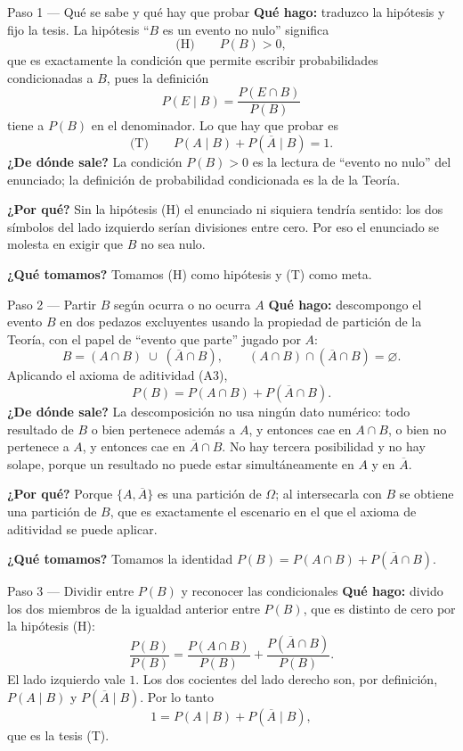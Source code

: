 \documentclass[11pt]{article}
\begin{document}
\begin{sol}
\begin{paso}{Paso 1 --- Qué se sabe y qué hay que probar}
\textbf{Qué hago:} traduzco la hipótesis y fijo la tesis. La hipótesis ``$B$ es un evento no
nulo'' significa
\[
\text{(H)}\qquad P(B)>0,
\]
que es exactamente la condición que permite escribir probabilidades condicionadas a $B$, pues
la definición
\[
P(E\mid B)=\frac{P(E\cap B)}{P(B)}
\]
tiene a $P(B)$ en el denominador. Lo que hay que probar es
\[
\text{(T)}\qquad P(A\mid B)+P(\overline{A}\mid B)=1 .
\]
\textbf{¿De dónde sale?} La condición $P(B)>0$ es la lectura de ``evento no nulo'' del
enunciado; la definición de probabilidad condicionada es la de la Teoría.

\textbf{¿Por qué?} Sin la hipótesis (H) el enunciado ni siquiera tendría sentido: los dos
símbolos del lado izquierdo serían divisiones entre cero. Por eso el enunciado se molesta en
exigir que $B$ no sea nulo.

\textbf{¿Qué tomamos?} Tomamos (H) como hipótesis y (T) como meta.
\end{paso}

\begin{paso}{Paso 2 --- Partir $B$ según ocurra o no ocurra $A$}
\textbf{Qué hago:} descompongo el evento $B$ en dos pedazos excluyentes usando la propiedad de
partición de la Teoría, con el papel de ``evento que parte'' jugado por $A$:
\[
B=(A\cap B)\;\cup\;(\overline{A}\cap B),
\qquad
(A\cap B)\cap(\overline{A}\cap B)=\varnothing .
\]
Aplicando el axioma de aditividad (A3),
\[
P(B)=P(A\cap B)+P(\overline{A}\cap B).
\]
\textbf{¿De dónde sale?} La descomposición no usa ningún dato numérico: todo resultado de $B$
o bien pertenece además a $A$, y entonces cae en $A\cap B$, o bien no pertenece a $A$, y
entonces cae en $\overline{A}\cap B$. No hay tercera posibilidad y no hay solape, porque un
resultado no puede estar simultáneamente en $A$ y en $\overline{A}$.

\textbf{¿Por qué?} Porque $\{A,\overline{A}\}$ es una partición de $\Omega$; al intersecarla
con $B$ se obtiene una partición de $B$, que es exactamente el escenario en el que el axioma
de aditividad se puede aplicar.

\textbf{¿Qué tomamos?} Tomamos la identidad $P(B)=P(A\cap B)+P(\overline{A}\cap B)$.
\end{paso}

\begin{paso}{Paso 3 --- Dividir entre $P(B)$ y reconocer las condicionales}
\textbf{Qué hago:} divido los dos miembros de la igualdad anterior entre $P(B)$, que es
distinto de cero por la hipótesis (H):
\[
\frac{P(B)}{P(B)}=\frac{P(A\cap B)}{P(B)}+\frac{P(\overline{A}\cap B)}{P(B)} .
\]
El lado izquierdo vale $1$. Los dos cocientes del lado derecho son, por definición,
$P(A\mid B)$ y $P(\overline{A}\mid B)$. Por lo tanto
\[
1=P(A\mid B)+P(\overline{A}\mid B),
\]
que es la tesis (T).


\end{paso}
\end{sol}
\end{document}
